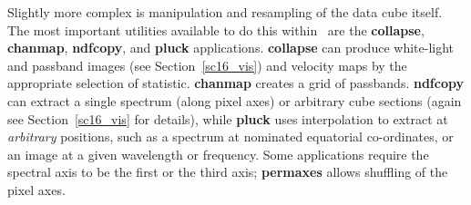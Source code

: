 \documentclass[twoside,11pt]{article}
\newcommand{\htmlref}[2]{#1}
\newcommand{\latex}[1]{#1}
\newcommand{\xref}[3]{#1}
\begin{document}
{Slightly more complex is manipulation and resampling of the data cube
itself.  The most important utilities available to do this within
\KAPPA\ are the \xref{{\bf collapse}}{sun95}{COLLAPSE}, 
\xref{{\bf chanmap}}{sun95}{CHANMAP}, \xref{{\bf ndfcopy}}{sun95}{NDFCOPY},
and \xref{{\bf pluck}}{sun95}{PLUCK} applications.  {\bf collapse} can
produce \htmlref{white-light and passband}{sc16_vis} images\latex{ (see 
Section~\ref{sc16_vis})} and velocity maps by the appropriate
selection of statistic.  {\bf chanmap} creates a grid of passbands.
{\bf ndfcopy} can extract a single spectrum (along pixel axes) or 
\htmlref{arbitrary cube sections}{sc16_vis} \latex{ (again see 
Section~\ref{sc16_vis} for details)}, while {\bf pluck} uses
interpolation to extract at {\em arbitrary} positions, such as a 
spectrum at nominated equatorial co-ordinates, or an image at a given
wavelength or frequency.  Some applications require the spectral
axis to be the first or the third axis; {\bf permaxes} allows
shuffling of the pixel axes.

}
\end{document}

